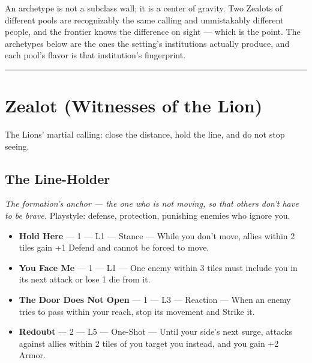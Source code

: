 An archetype is not a subclass wall; it is a center of gravity. Two Zealots of different pools are recognizably the same calling and unmistakably different people, and the frontier knows the difference on sight --- which is the point. The archetypes below are the ones the setting's institutions actually produce, and each pool's flavor is that institution's fingerprint.

\medskip\hrule\medskip

\section{Zealot \textnormal{(Witnesses of the Lion)}}

The Lions' martial calling: close the distance, hold the line, and do not stop seeing.

\subsection{The Line-Holder}
\textit{The formation's anchor --- the one who is not moving, so that others don't have to be brave.} Playstyle: defense, protection, punishing enemies who ignore you.
\begin{itemize}
    \item \textbf{Hold Here} --- 1 --- L1 --- Stance --- While you don't move, allies within 2 tiles gain +1 Defend and cannot be forced to move.
    \item \textbf{You Face Me} --- 1 --- L1 --- One enemy within 3 tiles must include you in its next attack or lose 1 die from it.
    \item \textbf{The Door Does Not Open} --- 1 --- L3 --- Reaction --- When an enemy tries to pass within your reach, stop its movement and Strike it.
    \item \textbf{Redoubt} --- 2 --- L5 --- One-Shot --- Until your side's next surge, attacks against allies within 2 tiles of you target you instead, and you gain +2 Armor.
\end{itemize}

